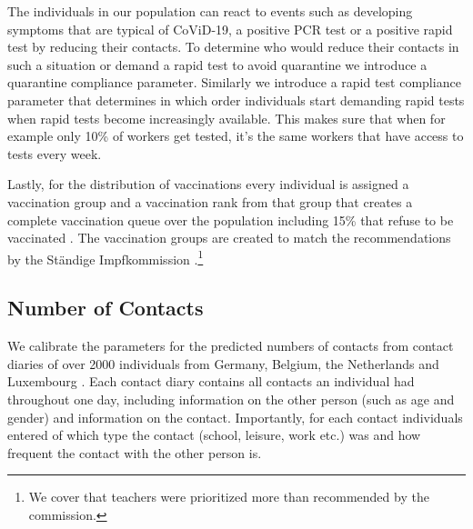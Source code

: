 The individuals in our population can react to events such as developing symptoms that
are typical of CoViD-19, a positive PCR test or a positive rapid test by reducing their
contacts. To determine who would reduce their contacts in such a situation or demand a
rapid test to avoid quarantine we introduce a quarantine compliance parameter. Similarly
we introduce a rapid test compliance parameter that determines in which order individuals
start demanding rapid tests when rapid tests become increasingly available. This makes
sure that when for example only 10\% of workers get tested, it's the same workers that
have access to tests every week.

Lastly, for the distribution of vaccinations every individual is assigned a vaccination
group and a vaccination rank from that group that creates a complete vaccination queue
over the population including 15\% that refuse to be vaccinated \citep{RKI2021}. The
vaccination groups are created to match the recommendations by the Ständige
Impfkommission \citep{VygenBonnet2020}.\footnote{We cover that teachers were prioritized
more than recommended by the commission.}





\FloatBarrier


\subsection{Number of Contacts}
\label{subsec:data_number_of_contacts}

We calibrate the parameters for the predicted numbers of contacts from contact diaries
of over 2000 individuals from Germany, Belgium, the Netherlands and Luxembourg
\citep{Mossong2008}. Each contact diary contains all contacts an individual had
throughout one day, including information on the other person (such as age and gender)
and information on the contact. Importantly, for each contact individuals entered of
which type the contact (school, leisure, work etc.) was and how frequent the contact
with the other person is.

